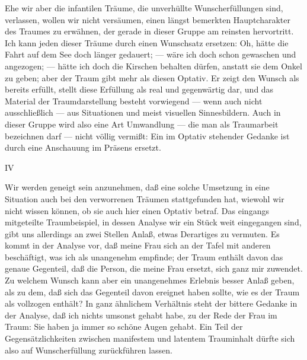 \documentclass{article}
\begin{document}
         
            
            
            
        \pstart
        Ehe wir aber die infantilen Träume, die unverhüllte Wunscherfüllungen
               sind, verlassen, wollen wir nicht versäumen, einen längst bemerkten
               Hauptcharakter des Traumes zu erwähnen, der gerade in dieser Gruppe am reinsten
               hervortritt. Ich kann jeden dieser Träume durch einen Wunschsatz ersetzen: Oh,
               hätte die Fahrt auf dem See doch länger gedauert; — wäre ich doch schon
               gewaschen und angezogen; — hätte ich doch die Kirschen behalten dürfen, anstatt
               sie dem Onkel zu geben; aber der Traum gibt mehr als diesen Optativ. Er zeigt
               den Wunsch als bereits erfüllt, stellt diese Erfüllung als real und gegenwärtig
               dar, und das Material der Traumdarstellung besteht vorwiegend — wenn auch
               nicht ausschließlich — aus Situationen und meist visuellen Sinnesbildern. Auch
               in dieser Gruppe wird also eine Art Umwandlung — die man als Traumarbeit
               bezeichnen darf — nicht völlig vermißt: Ein im
                  Optativ stehender Gedanke ist durch eine Anschauung im Präsens ersetzt.
        \pend
    
         
            
            
            
        \pstart
        IV
        \pend
    
            
        \pstart
        Wir werden geneigt sein anzunehmen, daß eine solche Umsetzung in eine
               Situation auch bei den verworrenen Träumen stattgefunden hat, wiewohl wir nicht
               wissen können, ob sie auch hier einen Optativ betraf. Das eingangs mitgeteilte
                  Traumbeispiel, in dessen Analyse wir ein Stück weit eingegangen
               sind, gibt uns allerdings an zwei Stellen Anlaß, etwas Derartiges zu
               vermuten. Es kommt in der Analyse vor, daß meine Frau sich an der Tafel mit
               anderen beschäftigt, was ich als unangenehm empfinde; der Traum enthält davon
               das genaue Gegenteil, daß die Person, die meine
               Frau ersetzt, sich ganz mir zuwendet. Zu welchem Wunsch kann aber ein
               unangenehmes Erlebnis besser Anlaß geben, als zu dem, daß sich das Gegenteil
               davon ereignet haben sollte, wie es der Traum als vollzogen enthält? In
               ganz ähnlichem Verhältnis steht der bittere Gedanke in der Analyse, daß ich
               nichts umsonst gehabt habe, zu der Rede der Frau im Traum: Sie haben ja immer so
               schöne Augen gehabt. Ein Teil der Gegensätzlichkeiten zwischen manifestem
               und latentem Trauminhalt dürfte sich also auf Wunscherfüllung zurückführen
               lassen.
        \pend
    
\end{document}

